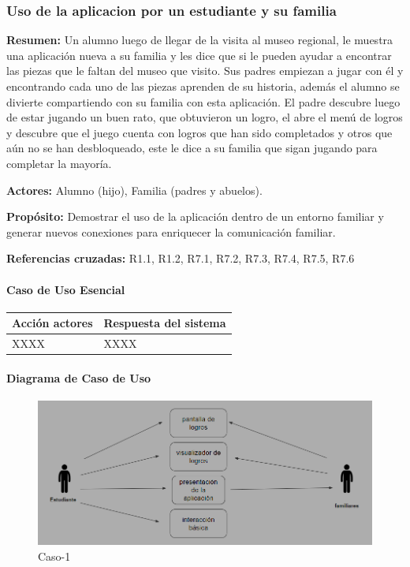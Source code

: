 \subsubsection{Uso de la aplicacion por un estudiante y su familia}

{\textbf {Resumen:}}
Un alumno luego de llegar de la visita al museo regional, le muestra una aplicación nueva a su familia y les dice que si le pueden ayudar a encontrar las piezas que le faltan del museo que visito. Sus padres empiezan a jugar con él y encontrando cada uno de las piezas aprenden de su historia, además el alumno se divierte compartiendo con su familia con esta aplicación. El padre descubre luego de estar jugando un buen rato, que obtuvieron un logro, el abre el menú de logros y descubre que el juego cuenta con logros que han sido completados y otros que aún no se han desbloqueado, este le dice a su familia que sigan jugando para completar la mayoría.

{\textbf {Actores:}}
Alumno (hijo), Familia (padres y abuelos).

{\textbf {Propósito:}}
Demostrar el uso de la aplicación dentro de un entorno familiar y generar nuevos conexiones para enriquecer la comunicación familiar.

{\textbf {Referencias cruzadas:}}
R1.1, R1.2, R7.1, R7.2, R7.3, R7.4, R7.5, R7.6

\paragraph{Caso de Uso Esencial}

\begin{longtable}{|p{5cm}|p{8cm}|}
\hline 
Acción actores & Respuesta del sistema \\ 
\hline 
XXXX & XXXX \\ 
\hline 
\end{longtable}

\paragraph{Diagrama de Caso de Uso}

\begin{figure}[H]
\centerline{\includegraphics[width=15cm]{imgs/CasoUso_7.PNG}}
\caption{Caso-1}
\label{fig}
\end{figure}

